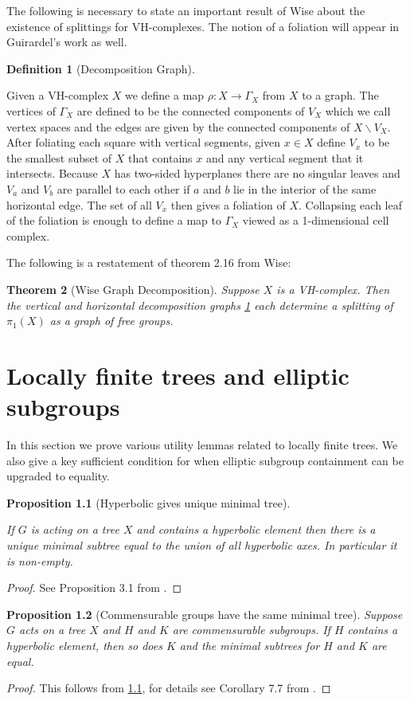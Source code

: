 \documentclass[12pt,parskip=full]{report}
\theoremstyle{plain}
\newtheorem{thm}{Theorem}[section]
\newtheorem{prop}[thm]{Proposition}
\theoremstyle{definition}
\newtheorem{dfn}[thm]{Definition}
\begin{document}
The following is necessary to state an important result of Wise about the existence of splittings for VH-complexes. The notion of a  foliation will appear in Guirardel's work as well.
\begin{dfn}
    [Decomposition Graph]
    \label{dfn:decompositiongraph}
    
    Given a VH-complex \(X\) we define a map \(\rho: X\to \Gamma_X\) from \(X\) to a graph. The vertices of \(\Gamma_X\) are defined to be the connected components of \(V_X\) which we call vertex spaces and the edges are given by the connected components of \(X\smallsetminus V_X\). After foliating each square with vertical segments, given \(x\in X\) define \(V_x\) to be the smallest subset of \(X\) that contains \(x\) and any vertical segment that it intersects. Because \(X\) has two-sided hyperplanes there are no singular leaves and \(V_a\) and \(V_b\) are parallel to each other if \(a\) and \(b\) lie in the interior of the same horizontal edge. The set of all \(V_x\) then gives a foliation of \(X\). Collapsing each leaf of the foliation is enough to define a map to \(\Gamma_X\) viewed as a 1-dimensional cell complex. 
\end{dfn}

The following is a restatement of theorem 2.16 \cite{wisethesis} from Wise:
\begin{thm}[Wise Graph Decomposition]
\label{thm:wisegraph}
Suppose \(X\) is a VH-complex. Then the vertical and horizontal decomposition graphs \ref{dfn:decompositiongraph} each determine a splitting of \(\pi_1(X)\) as a graph of free groups. 
\end{thm}

\chapter{Locally finite trees and elliptic subgroups}

In this section we prove various utility lemmas related to locally finite trees. We also give a key sufficient condition for when elliptic subgroup containment can be upgraded to equality.

\begin{prop}
    [Hyperbolic gives unique minimal tree]
    \label{pro:uniquemintree}
    
    If $G$ is acting on a tree $X$ and contains a hyperbolic element then there is a unique minimal subtree equal to the union of all hyperbolic axes. In particular it is non-empty.
\end{prop}
\begin{proof}
See Proposition 3.1 from \cite{hymanbass}.
\end{proof}
\begin{prop}
    [Commensurable groups have the same minimal tree]
    \label{pro:commintree}
    Suppose $G$ acts on a tree $X$ and $H$ and $K$ are commensurable subgroups. If $H$ contains a hyperbolic element, then so does $K$ and the minimal subtrees for $H$ and $K$ are equal.
\end{prop}
\begin{proof}
    This follows from \ref{pro:uniquemintree}, for details see Corollary 7.7 from \cite{hymanbass}.
\end{proof}
\end{document}
